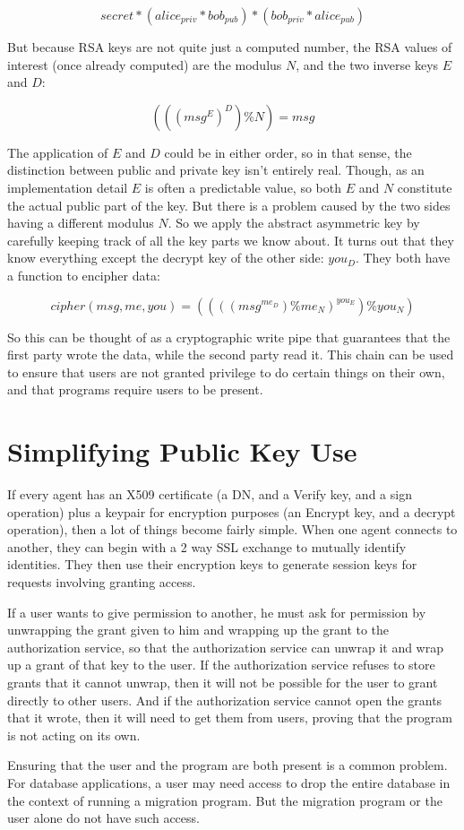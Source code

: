\documentclass{article}
\begin{document}
$$
secret * (alice_{priv} * bob_{pub}) * (bob_{priv} * alice_{pub})
$$

But because RSA keys are not quite just a computed number, the RSA values of interest (once already computed) are
the modulus $N$, and the two inverse keys $E$ and $D$:

$$
(((msg ^ E) ^ D) \% N) = msg
$$

The application of $E$ and $D$ could be in either order, so in that sense,
the distinction between public and private key isn't entirely real.
Though, as an implementation detail $E$ is often a predictable value, so 
both $E$ and $N$ constitute the actual public part of the key.
But there is a problem caused by the two sides having a different modulus $N$.
So we apply the abstract asymmetric key by carefully keeping track of all the key parts
we know about.  It turns out that they know everything except the decrypt key of the other side: $you_D$.
They both have a function to encipher data:

$$
cipher(msg, me, you) = ((((msg ^ {me_D}) \% me_N) ^ {you_E}) \% you_N)
$$

So this can be thought of as a cryptographic write pipe that guarantees that the first party wrote the data,
while the second party read it.  This chain can be used to ensure that users are not granted privilege to
do certain things on their own, and that programs require users to be present.

\section{Simplifying Public Key Use}

If every agent has an X509 certificate (a DN, and a Verify key, and a sign operation) plus a keypair for encryption purposes (an Encrypt key, and a decrypt operation), then a lot of things become fairly simple.  When one agent connects to another, they can begin with a 2 way SSL exchange to mutually identify identities.  They then use their encryption keys to generate session keys for requests involving granting access.

If a user wants to give permission to another, he must ask for permission by unwrapping the grant given to him and wrapping up the grant to the authorization service, so that the authorization service can unwrap it and wrap up a grant of that key to the user.  If the authorization service refuses to store grants that it cannot unwrap, then it will not be possible for the user to grant directly to other users.  And if the authorization service cannot open the grants that it wrote, then it will need to get them from users, proving that the program is not acting on its own.

Ensuring that the user and the program are both present is a common problem.  For database applications, a user may need access to drop the entire database in the context of running a migration program.  But the migration program or the user alone do not have such access.  
\end{document}
